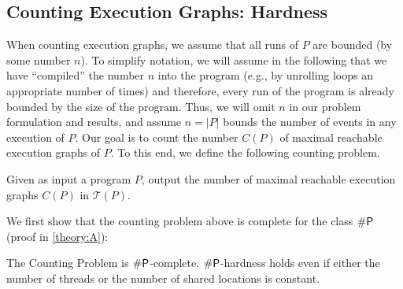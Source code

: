 
\subsection{Counting Execution Graphs: Hardness}

When counting execution graphs, we assume that all runs of $P$ are bounded (by some number $n$).
To simplify notation, we will assume in the following that we have ``compiled'' the number $n$ 
into the program (e.g., by unrolling loops an appropriate number of times) and 
therefore, every run of the program is already bounded by the size of the program. 
Thus, we will omit $n$ in our problem formulation and results, and assume $n = |P|$ 
bounds the number of events in any execution of $P$.
%
Our goal is to count the number $C(P)$ of maximal reachable execution graphs of $P$.
To this end, we define the following counting problem.

\begin{problem}
    \label{prob1}
    Given as input a program $P$, output the number of maximal reachable execution graphs $C(P)$ in $\mathcal{T}(P)$.
\end{problem}


We first show that the counting problem above is complete for the class $\#\mathsf{P}$ (proof in \cref{theory:A}):
\begin{theorem}\label{thm:counting-problem-hardness}
   The Counting Problem is $\#\mathsf{P}$-complete. 
   $\#\mathsf{P}$-hardness holds even if either the number of threads or the number of shared locations is constant.
\end{theorem}


